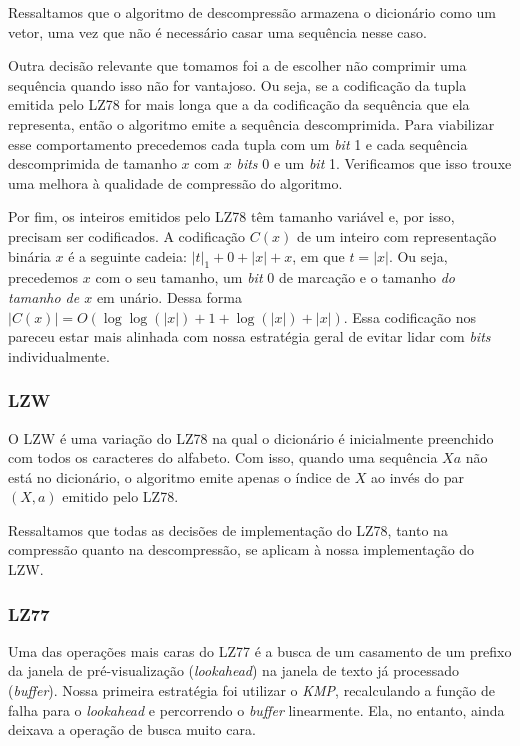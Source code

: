\documentclass[]{article}
\begin{document}
Ressaltamos que o algoritmo de descompressão armazena o dicionário como um vetor, uma vez que não é necessário casar uma sequência nesse caso.

Outra decisão relevante que tomamos foi a de escolher não comprimir uma sequência quando isso não for vantajoso. Ou seja, se a codificação da tupla emitida pelo LZ78 for mais longa que a da codificação da sequência que ela representa, então o algoritmo emite a sequência descomprimida. Para viabilizar esse comportamento precedemos cada tupla com um \textit{bit} 1 e cada sequência descomprimida de tamanho $x$ com $x$ \textit{bits} 0 e um \textit{bit} 1. Verificamos que isso trouxe uma melhora à qualidade de compressão do algoritmo.

Por fim, os inteiros emitidos pelo LZ78 têm tamanho variável e, por isso, precisam ser codificados. A codificação $C(x)$ de um inteiro com representação binária $x$ é a seguinte cadeia: $|t|_1 + 0 + |x| + x$, em que $t = |x|$. Ou seja, precedemos $x$ com o seu tamanho, um \textit{bit} 0 de marcação e o tamanho \textit{do tamanho de $x$} em unário. Dessa forma $|C(x)| = O(\log\log(|x|) + 1 + \log(|x|) + |x|)$. Essa codificação nos pareceu estar mais alinhada com nossa estratégia geral de evitar lidar com \textit{bits} individualmente.

\subsubsection{LZW}

O LZW é uma variação do LZ78 na qual o dicionário é inicialmente preenchido com todos os caracteres do alfabeto. Com isso, quando uma sequência $Xa$ não está no dicionário, o algoritmo emite apenas o índice de $X$ ao invés do par $(X,a)$ emitido pelo LZ78.

Ressaltamos que todas as decisões de implementação do LZ78, tanto na compressão quanto na descompressão, se aplicam à nossa implementação do LZW.

\subsubsection{LZ77}

Uma das operações mais caras do LZ77 é a busca de um casamento de um prefixo da janela de pré-visualização (\textit{lookahead}) na janela de texto já processado (\textit{buffer}). Nossa primeira estratégia foi utilizar o \textit{KMP}, recalculando a função de falha para o \textit{lookahead} e percorrendo o \textit{buffer} linearmente. Ela, no entanto, ainda deixava a operação de busca muito cara.
\end{document}
